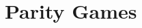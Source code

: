 \documentclass[graybox,envcountchap]{svmono}
\begin{document}
\chapter{Parity Games}
\label{3-chap:parity}

%



%

%

\end{document}
